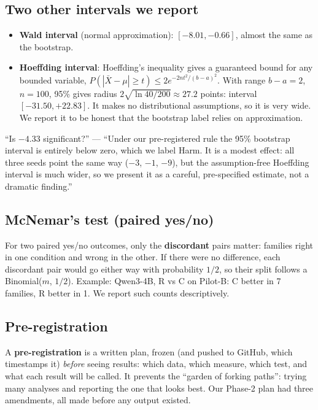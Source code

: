 \documentclass[11pt,a4paper]{article}
\begin{document}
\subsection{Two other intervals we report}
\begin{itemize}
\item \textbf{Wald interval} (normal approximation): $[-8.01, -0.66]$, almost the same as the bootstrap.
\item \textbf{Hoeffding interval}: Hoeffding's inequality gives a guaranteed bound for any bounded variable, $P(|\bar X - \mu| \ge t) \le 2e^{-2nt^2/(b-a)^2}$. With range $b-a = 2$, $n = 100$, 95\% gives radius $2\sqrt{\ln 40/200} \approx 27.2$ points: interval $[-31.50, +22.83]$. It makes no distributional assumptions, so it is very wide. We report it to be honest that the bootstrap label relies on approximation.
\end{itemize}

\begin{ifasked}
``Is $-4.33$ significant?'' --- ``Under our pre-registered rule the 95\% bootstrap interval is entirely below zero, which we label Harm. It is a modest effect: all three seeds point the same way ($-3$, $-1$, $-9$), but the assumption-free Hoeffding interval is much wider, so we present it as a careful, pre-specified estimate, not a dramatic finding.''
\end{ifasked}

\subsection{McNemar's test (paired yes/no)}
For two paired yes/no outcomes, only the \textbf{discordant} pairs matter: families right in one condition and wrong in the other. If there were no difference, each discordant pair would go either way with probability $1/2$, so their split follows a Binomial($m$, $1/2$). Example: Qwen3-4B, R vs C on Pilot-B: C better in 7 families, R better in 1. We report such counts descriptively.

\subsection{Pre-registration}
A \textbf{pre-registration} is a written plan, frozen (and pushed to GitHub, which timestamps it) \emph{before} seeing results: which data, which measure, which test, and what each result will be called. It prevents the ``garden of forking paths'': trying many analyses and reporting the one that looks best. Our Phase-2 plan had three amendments, all made before any output existed.
\end{document}
